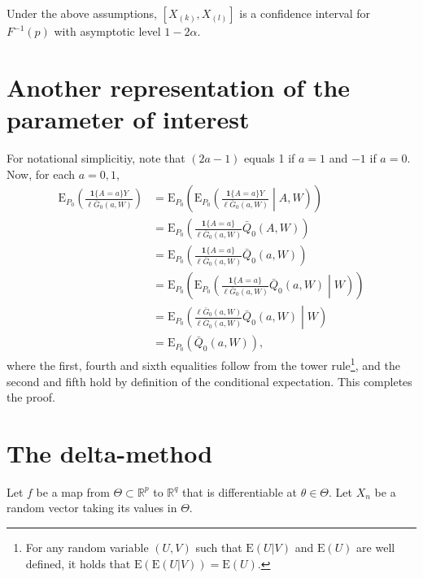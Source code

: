 \documentclass[11pt,openright,twoside]{book}
\newcommand{\bbR}{\mathbb{R}}
\newcommand{\Exp}{\textrm{E}}
\newcommand{\Gbar}{\bar{G}}
\newcommand{\one}{\textbf{1}}
\newcommand{\Qbar}{\bar{Q}}
\theoremstyle{definition}
\theoremstyle{definition}
\theoremstyle{definition}
\theoremstyle{remark}
\let\BeginKnitrBlock\begin \let\EndKnitrBlock\end
\begin{document}
\BeginKnitrBlock{proposition}
\protect\hypertarget{prp:unnamed-chunk-5}{}{\label{prp:unnamed-chunk-5} }Under the above assumptions, \([X_{(k)},X_{(l)}]\) is a confidence interval for
\(F^{-1}(p)\) with asymptotic level \(1 - 2\alpha\).
\EndKnitrBlock{proposition}

\hypertarget{another-rep}{%
\section{Another representation of the parameter of interest}\label{another-rep}}

For notational simplicitiy, note that \((2a-1)\) equals 1 if \(a=1\) and \(-1\) if
\(a=0\). Now, for each \(a = 0,1\), \begin{align*}
\Exp_{P_{0}}\left(\frac{\one\{A    =    a\}Y}{\ell\Gbar_{0}(a,W)}\right)    &=
\Exp_{P_{0}}\left(\Exp_{P_{0}}\left(\frac{\one\{A  = a\}Y}{\ell\Gbar_{0}(a,W)}
\middle|  A,  W  \right)   \right)  \\  &=  \Exp_{P_{0}}\left(\frac{\one\{A  =
a\}}{\ell\Gbar_{0}(a,W)}      \Qbar_{0}(A,      W)     \right)      \\      &=
\Exp_{P_{0}}\left(\frac{\one\{A   =    a\}}{\ell\Gbar_{0}(a,W)}   \Qbar_{0}(a,
W)\right)    \\    &=   \Exp_{P_{0}}\left(\Exp_{P_{0}}\left(\frac{\one\{A    =
a\}}{\ell\Gbar_{0}(a,W)}  \Qbar_{0}(a, W)  \middle|  W \right)  \right) \\&  =
\Exp_{P_{0}}\left(\frac{\ell\Gbar_{0}(a,W)}{\ell\Gbar_{0}(a,W)}   \Qbar_{0}(a,
W)  \middle| W  \right) \\&  =  \Exp_{P_{0}} \left(  \Qbar_{0}(a, W)  \right),
\end{align*} where the first, fourth and sixth equalities follow from the
tower rule\footnote{For any random variable \((U,V)\) such that \(\Exp(U|V)\) and
  \(\Exp(U)\) are well defined, it holds that \(\Exp(\Exp(U|V)) = \Exp(U)\).}, and
the second and fifth hold by definition of the conditional expectation. This
completes the proof.

\hypertarget{prop-delta-method}{%
\section{The delta-method}\label{prop-delta-method}}

Let \(f\) be a map from \(\Theta \subset \bbR^{p}\) to \(\bbR^{q}\) that is
differentiable at \(\theta\in \Theta\). Let \(X_{n}\) be a random vector taking its
values in \(\Theta\).
\end{document}
